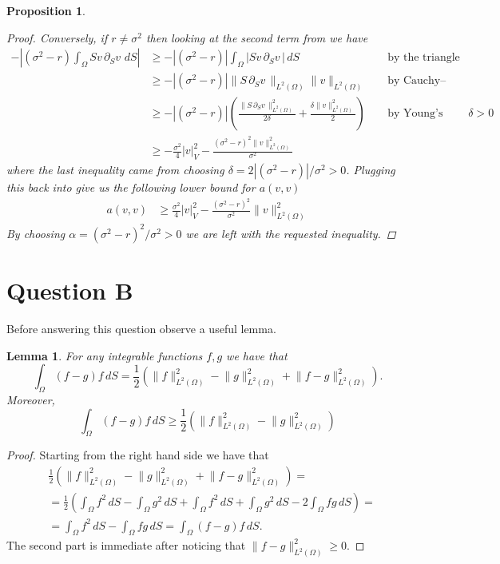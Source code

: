 \documentclass{article}
\newtheorem{lemma}[thm]{Lemma}
\newtheorem{prop}[thm]{Proposition}
\newcommand{\intS}[1]{\ensuremath{\int_{\Omega}#1 \, dS}}
\newcommand{\darg}[2]{\ensuremath{\, \partial_{#2}#1} \, }
\newcommand{\dS}[1]{\ensuremath{\darg{#1}{S}}}
\newcommand{\dSv}{\dS{v}}
\newcommand{\norm}[1]{\ensuremath{\|#1\|_{L^2(\Omega)}}}
\newcommand{\seminormsq}[1]{\ensuremath{|#1|_V^2}}
\newcommand{\normsq}[1]{\ensuremath{\|#1\|_{L^2(\Omega)}^2}}
\begin{document}
\begin{prop}
\begin{proof}
        Conversely, if $r \neq \sigma^2$ then looking at the second term from  we have
        \begin{align*}
            - \left| (\sigma^2 - r) \intS{S v \dSv}\right| &\geq - \left| (\sigma^2 - r) \right| \intS{\left|S v \dSv \right|} && \text{ by the triangle inequality}\\
            &\geq -\left| (\sigma^2 - r) \right| \norm{S \dSv} \norm{v} && \text{ by Cauchy–Schwarz inequality}\\
            &\geq -\left| (\sigma^2 - r) \right| \left( \frac{ \normsq{S \dSv}}{2 \delta} + \frac{\delta \normsq{v}}{2}\right) && \text{ by Young's inequality, $\delta >0$}\\
            & \geq - \frac{\sigma^2}{4} \seminormsq{v} - \frac{(\sigma^2 - r)^2 \normsq{v}}{ \sigma^2}
        \end{align*}
        where the last inequality came from choosing $\delta = 2| (\sigma^2 - r) | / \sigma^2 >0$. Plugging this back into  give us the following lower bound for $a(v,v)$
        \begin{align*}
            a(v,v) &\geq \frac{\sigma^2}{4} \seminormsq{v} - \frac{(\sigma^2 - r)^2}{ \sigma^2} \normsq{v}
        \end{align*}
        By choosing $\alpha = (\sigma^2 - r)^2 / \sigma^2 > 0$ we are left with the requested inequality.\qedhere
    \end{proof}
\end{prop}

\section{Question B}
Before answering this question observe a useful lemma.
\begin{lemma}\label{lemma_alg_id_and_ineq}
    For any integrable functions $f, g$ we have that
    \begin{equation*}
        \intS{(f - g)f} = \frac{1}{2}\left( \normsq{f} - \normsq{g} + \normsq{f - g}\right).
    \end{equation*}
    Moreover,
    $$\intS{(f - g)f} \geq \frac{1}{2}\left( \normsq{f} - \normsq{g} \right)$$
\end{lemma}
\begin{proof}
    Starting from the right hand side we have that
    \begin{align*}
        &\frac{1}{2}\left( \normsq{f} - \normsq{g} + \normsq{f - g}\right) =\\
        &=\frac{1}{2}\left(\intS{f^2} -  \intS{g^2} + \intS{f^2} +  \intS{g^2} - 2\intS{fg} \right) =\\
        &=\intS{f^2} - \intS{fg} = \intS{(f - g)f}.
    \end{align*}
    The second part is immediate after noticing that $\normsq{f - g} \geq 0$.
\end{proof}
\end{document}
